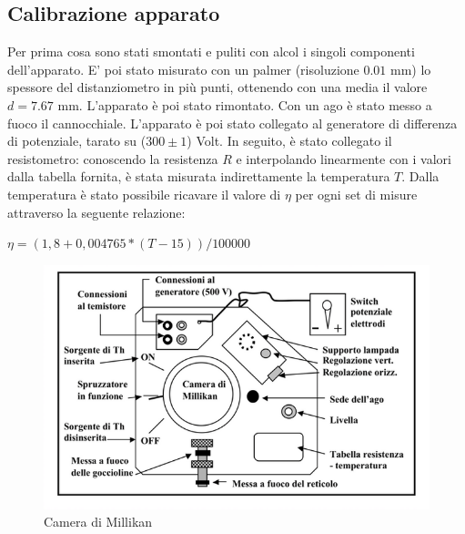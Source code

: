 \documentclass{article}
\begin{document}
    \subsection{Calibrazione apparato}
    
        Per prima cosa sono stati smontati e puliti con alcol i singoli componenti dell'apparato. E' poi stato misurato con un palmer (risoluzione $0.01$ mm) lo spessore del distanziometro in più punti, ottenendo con una media il valore $d=7.67$ mm. L'apparato è poi stato rimontato. Con un ago è stato messo a fuoco il cannocchiale. L'apparato è poi stato collegato al generatore di differenza di potenziale, tarato su ($300 \pm 1$) Volt. In seguito, è stato collegato il resistometro: conoscendo la resistenza $R$ e interpolando linearmente con i valori dalla tabella fornita, è stata misurata indirettamente la temperatura $T$. Dalla temperatura è stato possibile ricavare il valore di $\eta$ per ogni set di misure attraverso la seguente relazione:\\
        \begin{center} $ \eta=(1,8+0,004765*(T-15))/100000$ \end{center}

        \begin{figure}[H]
            \centering
            \includegraphics[width=1.\linewidth]{../images/camera.png}
            \caption{Camera di Millikan}
            \label{fig:camera_millikan}
        \end{figure}
        
\end{document}
